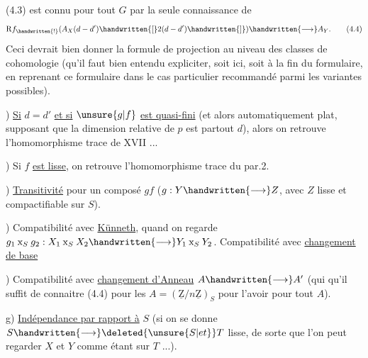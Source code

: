 (4.3) est connu pour tout $G$ par la seule connaissance de
\[
\mathrm{R}f_{\handwritten{!}}(A_X(d-d')\handwritten{[}2(d-d')\handwritten{]})\handwritten{\longrightarrow}A_Y.
\tag*{(4.4)}
\]
Ceci devrait bien donner la formule de projection au niveau des classes de cohomologie (qu'il faut bien entendu expliciter, soit ici, soit à la fin du formulaire, en reprenant ce formulaire dans  le cas particulier recommandé\handwritten{,} parmi les variantes possibles).

) \uline{Si} $d=d'$ \uline{et si} $\unsure{g|f}$ \uline{est quasi-fini} (et alors automatiquement plat, supposant que la dimension relative de $p$ est partout $d$), alors on retrouve l'homomorphisme trace de XVII ...

) Si $f$ \uline{est lisse}, on retrouve l'homomorphisme trace du par.2.

) \uline{Transitivité} pour un composé $gf$ ($g:Y\handwritten{\longrightarrow}Z$, avec $Z$ lisse et compactifiable sur $S$).

) Compatibilité avec \uline{Künneth}, quand on regarde $g_1\mathbin{\mathrm{x}}_S g_2:X_1\mathbin{\mathrm{x}}_S X_2\handwritten{\longrightarrow}Y_1\mathbin{\mathrm{x}}_S Y_2$. Compatibilité avec \uline{changement de base}

) Compatibilité avec \uline{changement d'Anneau} $A\handwritten{\longrightarrow}A'$ (qui  qu'il suffit de connaitre (4.4) pour les $A=(\underline{\mathrm{Z}}/n\underline{\mathrm{Z}})_S$ pour l'avoir pour tout $A$).

 g) \uline{Indépendance par rapport à} $S$ (si on se donne $S\handwritten{\longrightarrow}\deleted{\unsure{S|et}}T$ lisse, de sorte que l'on peut regarder $X$ et $Y$ comme étant sur $T$ ...).

